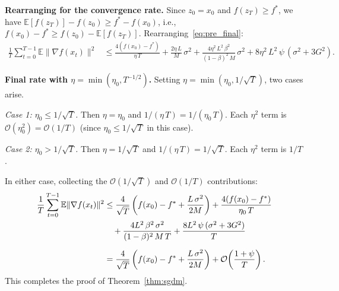 \documentclass{article}
\begin{document}
\medskip
\noindent\textbf{Rearranging for the convergence rate.}
Since $z_0 = x_0$ and $f(z_T) \geq f^*$, we have
$\mathbb{E}[f(z_T)] - f(z_0) \geq f^* - f(x_0)$, i.e.,
$f(x_0) - f^* \geq f(z_0) - \mathbb{E}[f(z_T)]$.
Rearranging~\eqref{eq:pre_final}:
\begin{align}
\frac{1}{T}\sum_{t=0}^{T-1}\mathbb{E}\|\nabla f(x_t)\|^2
&\leq \frac{4(f(x_0) - f^*)}{\eta\,T}
  + \frac{2\eta\,L}{M}\,\sigma^2
  + \frac{4\eta^2\,L^2\,\beta^2}{(1-\beta)^2\,M}\,\sigma^2
  + 8\eta^2\,L^2\,\psi\,(\sigma^2 + 3G^2).
\label{eq:rate_general}
\end{align}

\medskip
\noindent\textbf{Final rate with $\eta = \min(\eta_0, T^{-1/2})$.}
Setting $\eta = \min(\eta_0, 1/\sqrt{T})$, two cases arise.

\noindent\emph{Case 1: $\eta_0 \leq 1/\sqrt{T}$.}
Then $\eta = \eta_0$ and $1/(\eta\,T) = 1/(\eta_0\,T)$. Each
$\eta^2$ term is $\mathcal{O}(\eta_0^2) = \mathcal{O}(1/T)$ (since
$\eta_0 \leq 1/\sqrt{T}$ in this case).

\noindent\emph{Case 2: $\eta_0 > 1/\sqrt{T}$.}
Then $\eta = 1/\sqrt{T}$ and $1/(\eta\,T) = 1/\sqrt{T}$.
Each $\eta^2$ term is $1/T$.

In either case, collecting the $\mathcal{O}(1/\sqrt{T})$ and
$\mathcal{O}(1/T)$ contributions:
\begin{align}
\frac{1}{T}\sum_{t=0}^{T-1}\mathbb{E}\|\nabla f(x_t)\|^2
&\leq \frac{4}{\sqrt{T}}\left(f(x_0) - f^*
  + \frac{L\,\sigma^2}{2M}\right)
  + \frac{4(f(x_0) - f^*)}{\eta_0\,T} \notag \\
&\quad+ \frac{4L^2\,\beta^2\,\sigma^2}{(1-\beta)^2\,M\,T}
  + \frac{8L^2\,\psi\,(\sigma^2 + 3G^2)}{T} \notag \\[6pt]
&= \frac{4}{\sqrt{T}}\left(f(x_0) - f^*
  + \frac{L\,\sigma^2}{2M}\right)
  + \mathcal{O}\!\left(\frac{1 + \psi}{T}\right).
\label{eq:final_rate}
\end{align}
This completes the proof of Theorem~\ref{thm:sgdm}.
\end{document}
